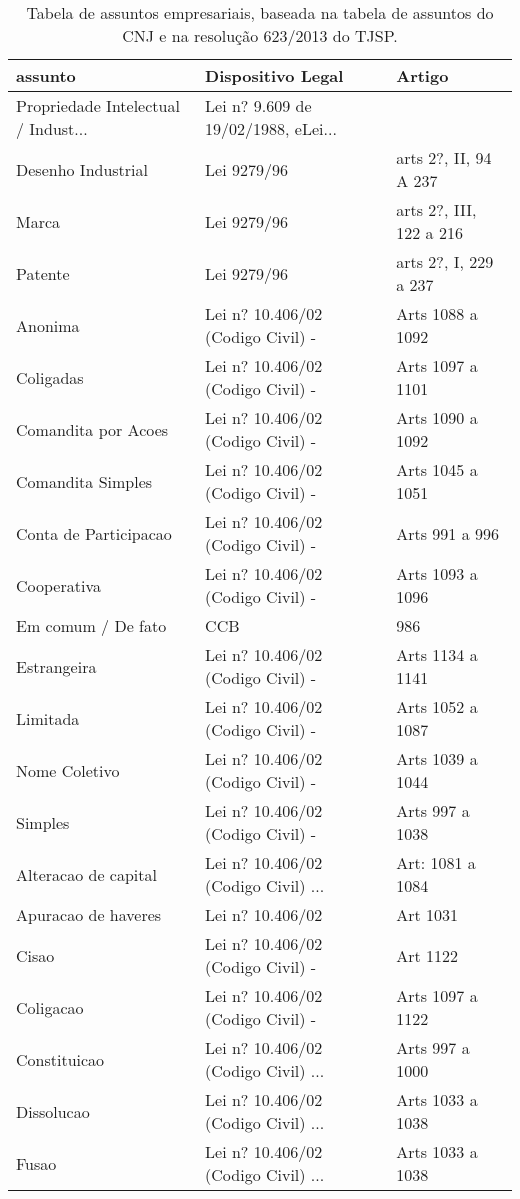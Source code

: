 \documentclass[]{book}
\begin{document}
\begin{longtable}[t]{lll}
\caption{\label{tab:cnj}Tabela de assuntos empresariais, baseada na tabela de assuntos do CNJ e na resolução 623/2013 do TJSP.}\\
\toprule
assunto & Dispositivo Legal & Artigo\\
\midrule
Propriedade Intelectual / Indust... & Lei n? 9.609 de 19/02/1988, eLei... & \\
Desenho Industrial & Lei 9279/96 & arts 2?, II, 94 A 237\\
Marca & Lei 9279/96 & arts 2?, III, 122 a 216\\
Patente & Lei 9279/96 & arts 2?, I, 229 a 237\\
Anonima & Lei n? 10.406/02 (Codigo Civil) - & Arts 1088 a 1092\\
\addlinespace
Coligadas & Lei n? 10.406/02 (Codigo Civil) - & Arts 1097 a 1101\\
Comandita por Acoes & Lei n? 10.406/02 (Codigo Civil) - & Arts 1090 a 1092\\
Comandita Simples & Lei n? 10.406/02 (Codigo Civil) - & Arts 1045 a 1051\\
Conta de Participacao & Lei n? 10.406/02 (Codigo Civil) - & Arts 991 a 996\\
Cooperativa & Lei n? 10.406/02 (Codigo Civil) - & Arts 1093 a 1096\\
\addlinespace
Em comum / De fato & CCB & 986\\
Estrangeira & Lei n? 10.406/02 (Codigo Civil) - & Arts 1134 a 1141\\
Limitada & Lei n? 10.406/02 (Codigo Civil) - & Arts 1052 a 1087\\
Nome Coletivo & Lei n? 10.406/02 (Codigo Civil) - & Arts 1039 a 1044\\
Simples & Lei n? 10.406/02 (Codigo Civil) - & Arts 997 a 1038\\
\addlinespace
Alteracao de capital & Lei n? 10.406/02 (Codigo Civil) ... & Art: 1081 a 1084\\
Apuracao de haveres & Lei n? 10.406/02 & Art 1031\\
Cisao & Lei n? 10.406/02 (Codigo Civil) - & Art 1122\\
Coligacao & Lei n? 10.406/02 (Codigo Civil) - & Arts 1097 a 1122\\
Constituicao & Lei n? 10.406/02 (Codigo Civil) ... & Arts 997 a 1000\\
\addlinespace
Dissolucao & Lei n? 10.406/02 (Codigo Civil) ... & Arts 1033 a 1038\\
Fusao & Lei n? 10.406/02 (Codigo Civil) ... & Arts 1033 a 1038\\

\end{longtable}
\end{document}
